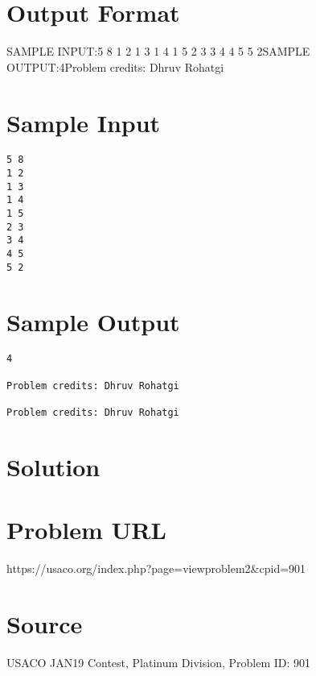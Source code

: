 \documentclass[12pt]{article}
\begin{document}
\section*{Output Format}
SAMPLE INPUT:5 8
1 2
1 3
1 4
1 5
2 3
3 4
4 5
5 2SAMPLE OUTPUT:4Problem credits: Dhruv Rohatgi

\section*{Sample Input}
\begin{verbatim}
5 8
1 2
1 3
1 4
1 5
2 3
3 4
4 5
5 2
\end{verbatim}

\section*{Sample Output}
\begin{verbatim}
4

Problem credits: Dhruv Rohatgi

Problem credits: Dhruv Rohatgi
\end{verbatim}

\section*{Solution}


\section*{Problem URL}
https://usaco.org/index.php?page=viewproblem2&cpid=901

\section*{Source}
USACO JAN19 Contest, Platinum Division, Problem ID: 901
\end{document}
